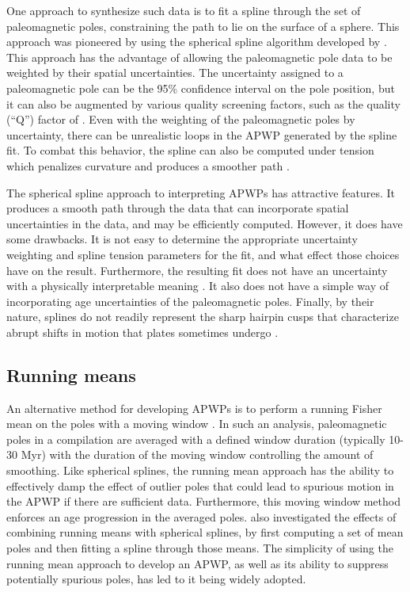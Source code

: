 \documentclass[11pt,letterpaper]{article}
\begin{document}
One approach to synthesize such data is to fit a spline through the set of paleomagnetic poles, constraining the path to lie on the surface of a sphere. This approach was pioneered by \cite{Torsvik1992a} using the spherical spline algorithm developed by \cite{Jupp1987a}. This approach has the advantage of allowing the paleomagnetic pole data to be weighted by their spatial uncertainties. The uncertainty assigned to a paleomagnetic pole can be the 95\% confidence interval on the pole position, but it can also be augmented by various quality screening factors, such as the quality (``Q'') factor of \cite{Van-der-Voo1990a} \citep{Torsvik1992a}. Even with the weighting of the paleomagnetic poles by uncertainty, there can be unrealistic loops in the APWP generated by the spline fit. To combat this behavior, the spline can also be computed under tension which penalizes curvature and produces a smoother path \citep{Torsvik1996a}.

The spherical spline approach to interpreting APWPs has attractive features. It produces a smooth path through the data that can incorporate spatial uncertainties in the data, and may be efficiently computed. However, it does have some drawbacks. It is not easy to determine the appropriate uncertainty weighting and spline tension parameters for the fit, and what effect those choices have on the result. Furthermore, the resulting fit does not have an uncertainty with a physically interpretable meaning \citep{Torsvik1996a}. It also does not have a simple way of incorporating age uncertainties of the paleomagnetic poles. Finally, by their nature, splines do not readily represent the sharp hairpin cusps that characterize abrupt shifts in motion that plates sometimes undergo \citep{Irving1972a, Gordon1984a}.

\subsection*{Running means}

An alternative method for developing APWPs is to perform a running Fisher mean on the poles with a moving window \citep{Irving1977a, Van-der-Voo2001a, Torsvik2008a}. In such an analysis, paleomagnetic poles in a compilation are averaged with a defined window duration (typically 10-30 Myr) with the duration of the moving window controlling the amount of smoothing. Like spherical splines, the running mean approach has the ability to effectively damp the effect of outlier poles that could lead to spurious motion in the APWP if there are sufficient data. Furthermore, this moving window method enforces an age progression in the averaged poles. \cite{Torsvik2008a} also investigated the effects of combining running means with spherical splines, by first computing a set of mean poles and then fitting a spline through those means. The simplicity of using the running mean approach to develop an APWP, as well as its ability to suppress potentially spurious poles, has led to it being widely adopted.
\end{document}

